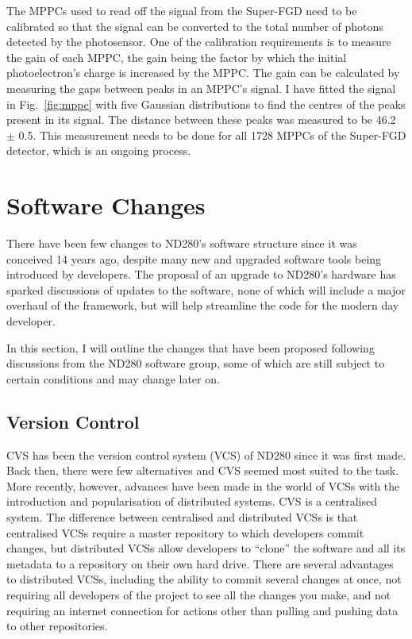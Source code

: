 \documentclass[aps,pra,12pt,notitlepage,tightenlines]{revtex4-1}
\begin{document}
The MPPCs used to read off the signal from the Super-FGD need to be calibrated so that the signal can be converted to the total number of photons detected by the photosensor. One of the calibration requirements is to measure the gain of each MPPC, the gain being the factor by which the initial photoelectron's charge is increased by the MPPC. The gain can be calculated by measuring the gaps between peaks in an MPPC's signal. I have fitted the signal in Fig.\ \ref{fig:mppc} with five Gaussian distributions to find the centres of the peaks present in its signal. The distance between these peaks was measured to be 46.2 $\pm$ 0.5. This measurement needs to be done for all 1728 MPPCs of the Super-FGD detector, which is an ongoing process.

\section{Software Changes}
There have been few changes to ND280's software structure since it was conceived 14 years ago, despite many new and upgraded software tools being introduced by developers. The proposal of an upgrade to ND280's hardware has sparked discussions of updates to the software, none of which will include a major overhaul of the framework, but will help streamline the code for the modern day developer. 

In this section, I will outline the changes that have been proposed following discussions from the ND280 software group, some of which are still subject to certain conditions and may change later on.

\subsection{Version Control}
CVS has been the version control system (VCS) of ND280 since it was first made. Back then, there were few alternatives and CVS seemed most suited to the task. More recently, however, advances have been made in the world of VCSs with the introduction and popularisation of distributed systems. CVS is a centralised system. The difference between centralised and distributed VCSs is that centralised VCSs require a master repository to which developers commit changes, but distributed VCSs allow developers to ``clone'' the software and all its metadata to a repository on their own hard drive. There are several advantages to distributed VCSs, including the ability to commit several changes at once, not requiring all developers of the project to see all the changes you make, and not requiring an internet connection for actions other than pulling and pushing data to other repositories.
\end{document}

